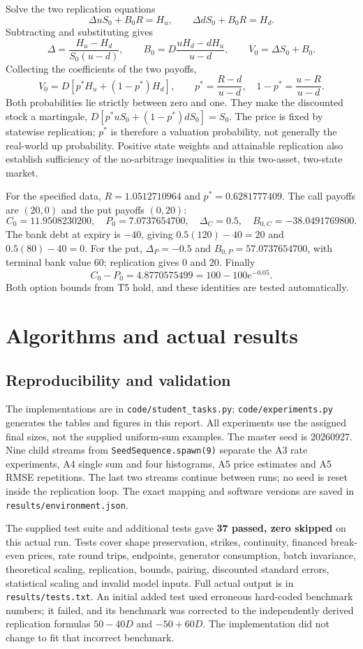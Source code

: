 \documentclass[11pt,a4paper]{article}
\begin{document}
Solve the two replication equations
\[
\Delta uS_0+B_0R=H_u,\qquad \Delta dS_0+B_0R=H_d.
\]
Subtracting and substituting gives
\[
\Delta=\frac{H_u-H_d}{S_0(u-d)},\qquad
B_0=D\frac{uH_d-dH_u}{u-d},\qquad V_0=\Delta S_0+B_0.
\]
Collecting the coefficients of the two payoffs,
\[
V_0=D[p^*H_u+(1-p^*)H_d],\qquad
p^*=\frac{R-d}{u-d},\quad1-p^*=\frac{u-R}{u-d}.
\]
Both probabilities lie strictly between zero and one. They make the discounted stock a martingale, $D[p^*uS_0+(1-p^*)dS_0]=S_0$. The price is fixed by statewise replication; $p^*$ is therefore a valuation probability, not generally the real-world up probability. Positive state weights and attainable replication also establish sufficiency of the no-arbitrage inequalities in this two-asset, two-state market.

For the specified data, $R=1.0512710964$ and $p^*=0.6281777409$. The call payoffs are $(20,0)$ and the put payoffs $(0,20)$:
\[
C_0=11.9508230200,\quad P_0=7.0737654700,\quad
\Delta_C=0.5,\quad B_{0,C}=-38.0491769800.
\]
The bank debt at expiry is $-40$, giving $0.5(120)-40=20$ and $0.5(80)-40=0$. For the put, $\Delta_P=-0.5$ and $B_{0,P}=57.0737654700$, with terminal bank value $60$; replication gives $0$ and $20$. Finally
\[
C_0-P_0=4.8770575499=100-100e^{-0.05}.
\]
Both option bounds from T5 hold, and these identities are tested automatically.

\clearpage
\section{Algorithms and actual results}
\subsection*{Reproducibility and validation}
The implementations are in \texttt{code/student\_tasks.py}; \texttt{code/experiments.py} generates the tables and figures in this report. All experiments use the assigned final sizes, not the supplied uniform-sum examples. The master seed is 20260927. Nine child streams from \texttt{SeedSequence.spawn(9)} separate the A3 rate experiments, A4 single sum and four histograms, A5 price estimates and A5 RMSE repetitions. The last two streams continue between runs; no seed is reset inside the replication loop. The exact mapping and software versions are saved in \texttt{results/environment.json}.

The supplied test suite and additional tests gave \textbf{37 passed, zero skipped} on this actual run. Tests cover shape preservation, strikes, continuity, financed break-even prices, rate round trips, endpoints, generator consumption, batch invariance, theoretical scaling, replication, bounds, pairing, discounted standard errors, statistical scaling and invalid model inputs. Full actual output is in \texttt{results/tests.txt}. An initial added test used erroneous hard-coded benchmark numbers; it failed, and its benchmark was corrected to the independently derived replication formulas $50-40D$ and $-50+60D$. The implementation did not change to fit that incorrect benchmark.
\end{document}
